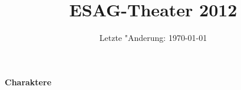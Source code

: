 \documentclass{scrartcl}
\newcommand{\s}[1]{\speaker #1}
\newcommand{\kregie}{\shortdirection}
\newcommand{\Frodo}{Frodo\xspace}
\begin{document}
%
%
\title{ESAG-Theater 2012}
\author{}
\date{Letzte "Anderung: \today}
\maketitle
\tableofcontents
%
%
%
%
\newpage
\textbf{Charaktere}

































\end{document}
